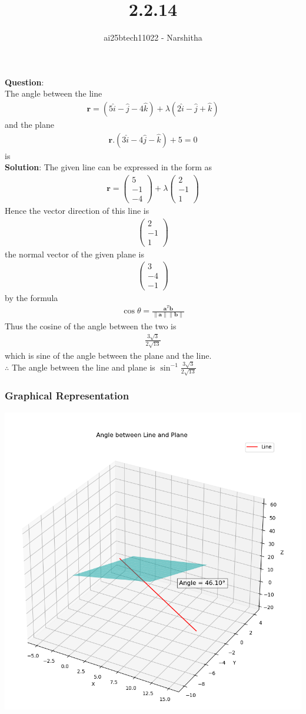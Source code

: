 \documentclass{beamer}
\title{2.2.14}
\author{ai25btech11022 - Narshitha}
\providecommand{\brak}[1]{\ensuremath{\left(#1\right)}}
\theoremstyle{remark}
\newcommand{\myvec}[1]{\ensuremath{\begin{pmatrix}#1\end{pmatrix}}}
\let\vec\mathbf
\numberwithin{equation}{section}
\begin{document}
{\let\newpage\relax\maketitle}
\renewcommand{\thefigure}{\theenumi}
\renewcommand{\thetable}{\theenumi} 
\textbf{Question}:\\The angle between the line \\
\begin{align}
\vec{r}=\brak{5\hat{i}-\hat{j}-4\hat{k}}+\lambda\brak{2\hat{i}-\hat{j}+\hat{k}}
\end{align}
and the plane 
\begin{align}
   \vec{r}.\brak{3\hat{i}-4\hat{j}-\hat{k}}+5=0
\end{align}
is\\
\textbf{Solution}:
The given line can be expressed in the form as \\
\begin{align}
    \vec{r}=\myvec{5\\-1\\-4}+\lambda\myvec{2\\-1\\1}
\end{align}
Hence the vector direction of this line is
\begin{align}
    \myvec{2\\-1\\1}
\end{align}
the normal vector of the given plane is
\begin{align}
    \myvec{3\\-4\\-1}
\end{align}
by the formula
\begin{align}
    \cos\theta=\frac{\vec{a}^T\vec{b}}{\|\vec{a}\|\|\vec{b}\|}
\end{align}
Thus the cosine of the angle between the two is
\begin{align}
\frac{3\sqrt{3}}{2\sqrt{13}}
\end{align}
which is sine of the angle between the plane and the line.\\
$\therefore$ The angle between the line and plane is $\sin^{-1}\frac{3\sqrt{3}}{2\sqrt{13}}$

\frametitle{Graphical Representation}
\begin{center}
    \includegraphics[width=0.7\linewidth]{figs/fig1.png}
\end{center}
    
\end{document}
